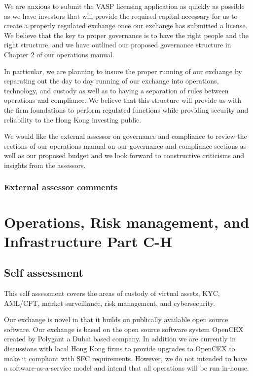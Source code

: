 \documentclass[]{report}
\begin{document}
We are anxious to submit the VASP licensing application as quickly as
possible as we have investors that will provide the required capital
necessary for us to create a properly regulated exchange once our
exchange has submitted a license.  We believe that the key to proper
governance is to have the right people and the right structure, and we
have outlined our proposed governance structure in Chapter 2 of our
operations manual.

In particular, we are planning to insure the proper running of our
exchange by separating out the day to day running of our exchange into
operations, technology, and custody as well as to having a separation
of rules between operations and compliance.  We believe that this
structure will provide us with the firm foundations to perform
regulated functions while providing security and reliability to the
Hong Kong investing public.

We would like the external assessor on governance and compliance to
review the sections of our operations manual on our governance and
compliance sections as well as our proposed budget and we look forward
to constructive criticisms and insights from the assessors.

\subsection{External assessor comments}

\chapter{Operations, Risk management, and Infrastructure Part C-H}

\section{Self assessment}

This self assessment covers the areas of custody of virtual assets,
KYC, AML/CFT, market surveillance, risk management, and cybersecurity.

Our exchange is novel in that it builds on publically available open
source software.  Our exchange is based on the open source software
system OpenCEX created by Polygant a Dubai based company.  In addition
we are currently in discussions with local Hong Kong firms to provide
upgrades to OpenCEX to make it compliant with SFC requirements.
However, we do not intended to have a software-as-a-service model and
intend that all operations will be run in-house.
\end{document}

